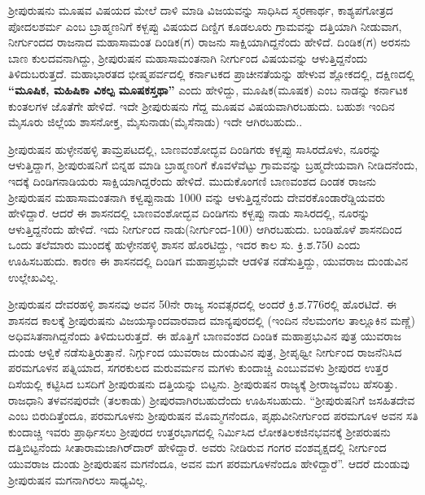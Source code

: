 ಶ‍್ರೀಪುರುಷನು ಮೂಷವ ವಿಷಯದ ಮೇಲೆ ದಾಳಿ ಮಾಡಿ ವಿಜಯವನ್ನು ಸಾಧಿಸಿದ ಸ್ಮರಣಾರ್ಥ, ಕಾಶ್ಯಪಗೋತ್ರದ ಪೋದಲಶರ್ಮ ಎಂಬ ಬ್ರಾಹ್ಮಣನಿಗೆ ಕಳ್ಬಪ್ಪು ವಿಷಯದ ದಿಣ್ಡಿಗ ಕೂಡಲೂರು ಗ್ರಾಮವನ್ನು ದತ್ತಿಯಾಗಿ ನೀಡುವಾಗ, ನೀರ್ಗುಂದದ ರಾಜನಾದ ಮಹಾಸಾಮಂತ ದಿಂಡಿಕ(ಗ) ರಾಜನು ಸಾಕ್ಷಿಯಾಗಿದ್ದನೆಂದು ಹೇಳಿದೆ. ದಿಂಡಿಕ(ಗ) ಅರಸನು ಬಾಣ ಕುಲದವ\-ನಾಗಿದ್ದು, ಶ‍್ರೀಪುರುಷನ ಮಹಾಸಾಮಂತನಾಗಿ ನೀರ್ಗುಂದ ವಿಷಯವನ್ನು ಆಳುತ್ತಿದ್ದನೆಂದು ತಿಳಿದುಬರುತ್ತದೆ. ಮಹಾಭಾರತದ ಭೀಷ್ಮಪರ್ವದಲ್ಲಿ ಕರ್ನಾಟಕದ ಪ್ರಾಚೀನತೆಯನ್ನು ಹೇಳುವ ಶ್ಲೋಕದಲ್ಲಿ, ದಕ್ಷಿಣದಲ್ಲಿ\textbf{ “ಮೂಷಿಕ, ಮಹಿಷಿಕಾ ವಿಕಲ್ಪ ಮೂಷಕಸ್ತಥಾ” }ಎಂದು ಹೇಳಿದ್ದು, ಮೂಷಿಕ(ಮೂಷಕ) ಎಂಬ ನಾಡನ್ನು ಕರ್ನಾಟಕ ಕುಂತಲಗಳ ಜೊತೆಗೇ ಹೇಳಿದೆ. ಇದೇ ಶ‍್ರೀಪುರುಷನು ಗೆದ್ದ ಮೂಷವ ವಿಷಯವಾಗಿರಬಹುದು. ಬಹುಶಃ ಇಂದಿನ ಮೈಸೂರು ಜಿಲ್ಲೆಯ ಶಾಸನೋಕ್ತ, ಮೈಸುನಾಡು(ಮೈಸೆನಾಡು) ಇದೇ ಆಗಿರಬಹುದು..

ಶ‍್ರೀಪುರುಷನ ಹುಳ್ಳೇನಹಳ್ಳಿ ತಾಮ್ರಪಟದಲ್ಲಿ, ಬಾಣವಂಶೋದ್ಭವ ದಿಂಡಿಗರು ಕಳ್ಬಪ್ಪು ಸಾಸಿರದೊಳು, ನೂರನ್ನು ಆಳುತ್ತಿದ್ದಾಗ, ಶ‍್ರೀಪುರುಷನಿಗೆ ಬಿನ್ನಹ ಮಾಡಿ ಬ್ರಾಹ್ಮಣರಿಗೆ ಕೊವಳೆವೆಟ್ಟು ಗ್ರಾಮವನ್ನು ಬ್ರಹ್ಮದೇಯವಾಗಿ ನೀಡಿದನೆಂದು, ಇದಕ್ಕೆ ದಿಂಡಿಗನಾಡಿಯರು ಸಾಕ್ಷಿಯಾಗಿದ್ದರೆಂದು ಹೇಳಿದೆ. ಮುದುಕೊಂಗಣಿ ಬಾಣವಂಶದ ದಿಂಡಕ ರಾಜನು ಶ‍್ರೀಪುರುಷನ ಮಹಾಸಾಮಂತನಾಗಿ ಕಳ್ವಪ್ಪುನಾಡು 1000 ವನ್ನು ಆಳುತ್ತಿದ್ದನೆಂದು ದೇವರಕೊಂಡಾರೆಡ್ಡಿಯವರು ಹೇಳಿದ್ದಾರೆ. ಆದರೆ ಈ ಶಾಸನದಲ್ಲಿ ಬಾಣವಂಶೋದ್ಭವ ದಿಂಡಿಗನು ಕಳ್ಬಪ್ಪು ನಾಡು ಸಾಸಿರದಲ್ಲಿ, ನೂರನ್ನು ಆಳುತ್ತಿದ್ದನೆಂದು ಹೇಳಿದೆ. ಇದು ನೀರ್ಗುಂದ ನಾಡು(ನೀರ್ಗುಂದ-100) ಆಗಿರಬಹುದು. ಬಂಡಿಹೊಳೆ ಶಾಸನದಿಂದ ಒಂದು ತಲೆಮಾರು ಮುಂದಕ್ಕೆ ಹುಳ್ಳೇನಹಳ್ಳಿ ಶಾಸನ ಹೊರಟಿದ್ದು, ಇದರ ಕಾಲ ಸು. ಕ್ರಿ.ಶ.750 ಎಂದು ಊಹಿಸಬಹುದು. ಕಾರಣ ಈ ಶಾಸನದಲ್ಲಿ ದಿಂಡಿಗ ಮಹಾಪ್ರಭುವೇ ಆಡಳಿತ ನಡೆಸುತ್ತಿದ್ದು, ಯುವರಾಜ ದುಂಡುವಿನ ಉಲ್ಲೇಖವಿಲ್ಲ.

\newpage

ಶ‍್ರೀಪುರುಷನ ದೇವರಹಳ್ಳಿ ಶಾಸನವು ಅವನ 50ನೇ ರಾಜ್ಯ ಸಂವತ್ಸರದಲ್ಲಿ ಅಂದರೆ ಕ್ರಿ.ಶ.776ರಲ್ಲಿ ಹೊರಟಿದೆ. ಈ ಶಾಸನದ ಕಾಲಕ್ಕೆ ಶ‍್ರೀಪುರುಷನು ವಿಜಯಸ್ಕಾಂದವಾರವಾದ ಮಾನ್ಯಪುರದಲ್ಲಿ (ಇಂದಿನ ನೆಲಮಂಗಲ ತಾಲ್ಲೂಕಿನ ಮಣ್ಣೆ) ಅಧಿವಸಿತನಾಗಿದ್ದನೆಂದು ತಿಳಿದುಬರುತ್ತದೆ. ಈ ಹೊತ್ತಿಗೆ ಬಾಣವಂಶದ ದಿಂಡಿಕ ಮಹಾಪ್ರಭುವಿನ ಪುತ್ರ ಯುವರಾಜ ದುಂಡು ಆಳ್ವಿಕೆ ನಡೆಸುತ್ತಿರುತ್ತಾನೆ. ನಿರ್ಗ್ಗುಂದ ಯುವರಾಜ ದುಂಡುವಿನ ಪುತ್ರ, ಶ‍್ರೀಪೃಥ್ವೀ ನೀರ್ಗುಂದ ರಾಜನೆನಿಸಿದ ಪರಮಗೂಳನ ಪತ್ನಿಯಾದ, ಸಗರಕುಲದ ಮರುವರ್ಮನ ಮಗಳು ಕುಂದಾಚ್ಚಿ ಎಂಬುವವಳು ಶ‍್ರೀಪುರದ ಉತ್ತರ ದಿಸೆಯಲ್ಲಿ ಕಟ್ಟಿಸಿದ ಬಸದಿಗೆ ಶ‍್ರೀಪುರುಷನು ದತ್ತಿಯನ್ನು ಬಿಟ್ಟನು. ಶ‍್ರೀಪುರುಷನ ರಾಜ್ಯಕ್ಕೆ ಶ‍್ರೀರಾಜ್ಯವೆಂಬ ಹೆಸರಿತ್ತು. ರಾಜಧಾನಿ ತಳವನಪುರವೇ (ತಲಕಾಡು) ಶ‍್ರೀಪುರವಾಗಿರಬಹುದೆಂದು ಊಹಿಸಬಹುದು. “ಶ‍್ರೀಪುರುಷನಿಗೆ ಜಸಹಿತದೇವ ಎಂಬ ಬಿರುದಿತ್ತೆಂದೂ, ಪರಮಗೂಳನು ಶ‍್ರೀಪುರುಷನ ಮೊಮ್ಮಗನೆಂದೂ, ಪೃಥುವೀನೀರ್ಗುಂದ ಪರಮಗೂಳ ಅವನ ಸತಿ ಕುಂದಾಚ್ಚಿ ಇವರು ಪ್ರಾರ್ಥಿಸಲು ಶ‍್ರೀಪುರದ ಉತ್ತರಭಾಗದಲ್ಲಿ ನಿರ್ಮಿಸಿದ ಲೋಕತಿಲಕಜಿನಭವನಕ್ಕೆ ಶ‍್ರೀಪರುಷನು ದತ್ತಿಬಿಟ್ಟನೆಂದು ಸೀತಾರಾಮ\-ಜಾಗಿರ್​ದಾರ್​ ಹೇಳಿದ್ದಾರೆ. ಅವರು ನೀಡಿರುವ ಗಂಗರ ವಂಶವೃಕ್ಷದಲ್ಲಿ ನೀರ್ಗುಂದ ಯುವರಾಜ ದುಂಡು ಶ‍್ರೀಪುರುಷನ ಮಗನೆಂದೂ, ಅವನ ಮಗ ಪರಮಗೂಳನೆಂದೂ ಹೇಳಿದ್ದಾರೆ”. ಆದರೆ ದುಂಡುವು ಶ‍್ರೀಪುರುಷನ ಮಗನಾಗಿರಲು ಸಾಧ್ಯವಿಲ್ಲ.


